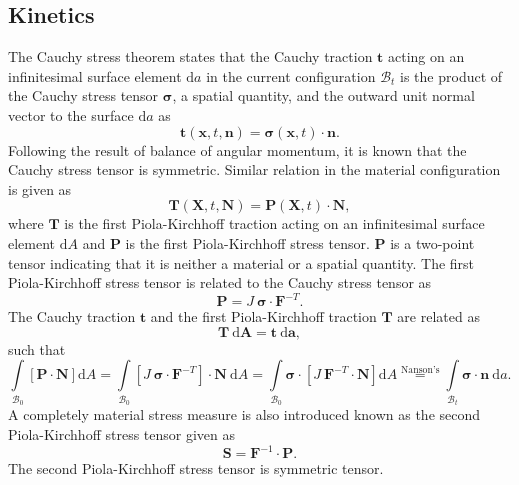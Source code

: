 \subsection{Kinetics}
The Cauchy stress theorem states that the Cauchy traction $\mathbf{t}$ acting on an infinitesimal surface element $\mathrm{d}a$ in the current configuration $\mathcal{B}_t$ is the product of the Cauchy stress tensor $\bm{\sigma}$, a spatial quantity, and the outward unit normal vector to the surface $\mathrm{d}a$ as 
\begin{equation}
\mathbf{t}(\mathbf{x}, t, \mathbf{n}) = \bm{\sigma}(\mathbf{x}, t) \cdot \mathbf{n}.
\end{equation}
Following the result of balance of angular momentum, it is known that the Cauchy stress tensor is symmetric. Similar relation in the material configuration is given as 
\begin{equation}
\mathbf{T}(\mathbf{X}, t, \mathbf{N}) = \mathbf{P}(\mathbf{X}, t) \cdot \mathbf{N},
\end{equation}
where $\mathbf{T}$ is the first Piola-Kirchhoff traction acting on an infinitesimal surface element $\mathrm{d}A$ and $\mathbf{P}$ is the first Piola-Kirchhoff stress tensor. $\mathbf{P}$ is a two-point tensor indicating that it is neither a material or a spatial quantity. The first Piola-Kirchhoff stress tensor is related to the Cauchy stress tensor as 
\begin{equation}
\mathbf{P} = J \ \bm{\sigma} \cdot \mathbf{F}^{-T}.
\end{equation}
The Cauchy traction $\mathbf{t}$ and the first Piola-Kirchhoff traction $\mathbf{T}$ are related as 
\begin{equation}
\mathbf{T} \ \bm{\mathrm{d}}\mathbf{A} = \mathbf{t} \ \bm{\mathrm{d}}\mathbf{a},
\end{equation}
such that
\begin{equation}
\int\limits_{\mathcal{B}_0} \left[ \mathbf{P} \cdot \mathbf{N} \right] \mathrm{d}A = \int\limits_{\mathcal{B}_0} \left[ J \ \bm{\sigma} \cdot \mathbf{F}^{-T} \right] \cdot \mathbf{N} \ \mathrm{d}A = \int\limits_{\mathcal{B}_0} \bm{\sigma} \cdot \left[ J \ \mathbf{F}^{-T} \cdot \mathbf{N} \right] \mathrm{d}A \stackrel{\text{Nanson's}}{=} \int\limits_{\mathcal{B}_t} \bm{\sigma} \cdot \mathbf{n} \ \mathrm{d}a.
\end{equation}
A completely material stress measure is also introduced known as the second Piola-Kirchhoff stress tensor given as
\begin{equation}
\mathbf{S} = \mathbf{F}^{-1} \cdot \mathbf{P}.
\end{equation}
The second Piola-Kirchhoff stress tensor is symmetric tensor.

